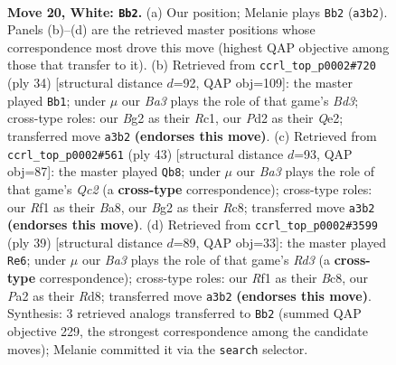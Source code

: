 \documentclass[11pt]{article}
\begin{document}
\clearpage

\begin{figure}[p]\centering
\begin{subfigure}{0.46\textwidth}\centering
\resizebox{\linewidth}{!}{%
\newchessgame
\chessboard[
  setfen={r3qrk1/6bn/1pn3p1/p1p1Pp1p/2P3bP/BPNN4/P1QP2B1/1R3RK1 w - f6 0 20},
  showmover=false,
  pgfstyle=straightmove, color=movearrow, markmove={a3-b2}
]}
\caption{}
\end{subfigure}\hfill
\begin{subfigure}{0.46\textwidth}\centering
\resizebox{\linewidth}{!}{%
\newchessgame
\chessboard[
  setfen={2rq1rk1/1b2bpp1/p1n1p2p/1p2P3/3pN2P/P2B1N2/1P2QPP1/2RR2K1 w - - 3 18},
  showmover=false,
  pgfstyle=straightmove, color=movearrow, markmove={d3-b1}
]}
\caption{}
\end{subfigure}
\\[4pt]
\begin{subfigure}{0.46\textwidth}\centering
\resizebox{\linewidth}{!}{%
\newchessgame
\chessboard[
  setfen={b1rr2k1/2qnbpp1/pp1pp2p/4n3/N1P1P3/1P2BP2/P1NQ2PP/2RR1B1K b - - 2 22},
  showmover=false,
  pgfstyle=straightmove, color=movearrow, markmove={c7-b8}
]}
\caption{}
\end{subfigure}\hfill
\begin{subfigure}{0.46\textwidth}\centering
\resizebox{\linewidth}{!}{%
\newchessgame
\chessboard[
  setfen={1kbr4/1pp1q2p/p1nr1n2/4p3/1PN1Pp2/P2P4/1B2BPPP/2RQ1RK1 b - - 2 20},
  showmover=false,
  pgfstyle=straightmove, color=movearrow, markmove={d6-e6}
]}
\caption{}
\end{subfigure}
\caption{\textbf{Move 20, White: \texttt{Bb2}.} (a) Our position; Melanie plays \texttt{Bb2} (\texttt{a3b2}). Panels (b)--(d) are the retrieved master positions whose correspondence most drove this move (highest QAP objective among those that transfer to it). (b) Retrieved from \texttt{ccrl\_top\_p0002\#720} (ply 34) [structural distance $d$=92, QAP obj=109]: the master played \texttt{Bb1}; under $\mu$ our \emph{Ba3} plays the role of that game's \emph{Bd3}; cross-type roles: our \emph{B}g2 as their \emph{R}c1, our \emph{P}d2 as their \emph{Q}e2; transferred move \texttt{a3b2} \textbf{(endorses this move)}. (c) Retrieved from \texttt{ccrl\_top\_p0002\#561} (ply 43) [structural distance $d$=93, QAP obj=87]: the master played \texttt{Qb8}; under $\mu$ our \emph{Ba3} plays the role of that game's \emph{Qc2} (a \textbf{cross-type} correspondence); cross-type roles: our \emph{R}f1 as their \emph{B}a8, our \emph{B}g2 as their \emph{R}c8; transferred move \texttt{a3b2} \textbf{(endorses this move)}. (d) Retrieved from \texttt{ccrl\_top\_p0002\#3599} (ply 39) [structural distance $d$=89, QAP obj=33]: the master played \texttt{Re6}; under $\mu$ our \emph{Ba3} plays the role of that game's \emph{Rd3} (a \textbf{cross-type} correspondence); cross-type roles: our \emph{R}f1 as their \emph{B}c8, our \emph{P}a2 as their \emph{R}d8; transferred move \texttt{a3b2} \textbf{(endorses this move)}. Synthesis: 3 retrieved analogs transferred to \texttt{Bb2} (summed QAP objective 229, the strongest correspondence among the candidate moves); Melanie committed it via the \texttt{search} selector.}
\label{fig:thought-m38}
\end{figure}
\end{document}
